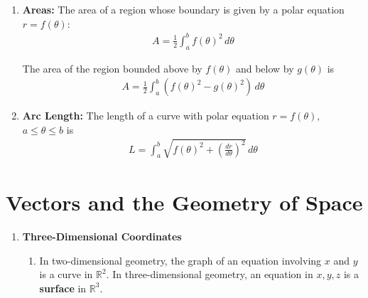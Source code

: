 \documentclass[10pt]{article}
\begin{document}
\begin{multicols}{2}
\begin{enumerate}
\begin{enumerate}
        \item \textbf{Areas:} The area of a region whose boundary is given by a polar equation $r=f(\theta)$:
        \begin{align*}
            A = \frac{1}{2} \int_a^b f(\theta)^2 \, d\theta
        \end{align*}
        
        The area of the region bounded above by $f(\theta)$ and below by $g(\theta)$ is
        \begin{align*}
            A = \frac{1}{2} \int_a^b (f(\theta)^2 - g(\theta)^2) \, d\theta
        \end{align*}
        
        \item \textbf{Arc Length:} The length of a curve with polar equation $r=f(\theta)$, $a \leq \theta \leq b$ is
        \begin{align*}
            L = \int_a^b \sqrt{f(\theta)^2 + \left( \frac{dr}{d\theta} \right)^2} \, d\theta
        \end{align*}
    \end{enumerate}
\end{enumerate}


\section{Vectors and the Geometry of Space}
\begin{enumerate}
    \item \textbf{Three-Dimensional Coordinates}
    \begin{enumerate}
        \item In two-dimensional geometry, the graph of an equation involving $x$ and $y$ is a curve in $\mathbb{R}^2$. In three-dimensional geometry, an equation in $x,y,z$ is a \textbf{surface} in $\mathbb{R}^3$.


\end{enumerate}
\end{enumerate}
\end{multicols}
\end{document}
